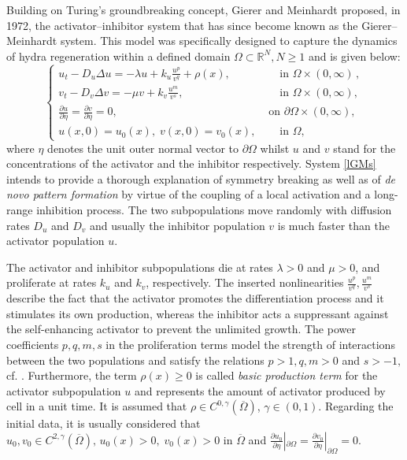 \documentclass[leqno,12pt]{article}
\newcommand{\R}{\mathbb R}
\numberwithin{equation}{section}
\begin{document}
Building on Turing’s groundbreaking concept, Gierer and Meinhardt \cite{GM72} proposed, in 1972, the activator–inhibitor system that has since become known as the Gierer–Meinhardt system. This model was specifically designed to capture the dynamics of hydra regeneration within a defined domain $\Omega\subset \R^N, N\geq 1$ and is given below:
\begin{equation}\label{lGMs}
\begin{cases}
\displaystyle   u_t-D_u\Delta u=-\lambda u+k_u\frac{u^p}{v^q}+\rho(x), &\quad\mbox{ in }\Omega\times(0,\infty)\, ,\\[0.1in]
\displaystyle  v_t -D_v\Delta v=-\mu v+k_v\frac{u^m}{v^s}, &\quad\mbox{ in }\Omega\times(0,\infty),\\[0.1in]
\displaystyle\frac{\partial u}{\partial \eta}=\displaystyle\frac{\partial v}{\partial \eta}=0,  &\mbox{ on }\partial\Omega\times(0,\infty),\,\\[0.1in]
u(x,0)=u_0(x), \; v(x,0)=v_0(x), &\quad\mbox{ in }\Omega,
\end{cases}
\end{equation}
where $\eta$ denotes the unit outer normal vector to $\partial \Omega$ whilst $u$ and $v$ stand for the concentrations
of the activator and the inhibitor respectively. System \eqref{lGMs} intends to provide a thorough explanation of symmetry breaking as well as of {\it de novo pattern formation} by virtue of the coupling of a local activation and a long-range inhibition process.
The two subpopulations move randomly with diffusion rates $D_{u}$ and $D_{v}$ and usually the inhibitor population $v$ is  much faster than the activator population $u.$

The activator and inhibitor subpopulations die at rates $\lambda>0$ and $\mu>0$, and proliferate at rates $k_{u}$ and $k_{v}$, respectively. The inserted nonlinearities $\frac{u^p}{v^q}, \frac{u^m}{v^s}$ describe the fact that the activator promotes the differentiation process and it stimulates its own production, whereas the inhibitor acts a suppressant against the self-enhancing activator to prevent the unlimited growth. The  power coefficients $p,q,m,s$ in the proliferation terms model the strength of interactions between the two populations and satisfy the relations $p>1, q,m>0$ and $s>-1,$ cf. \cite{KS17, KS18}. Furthermore, the term $\rho(x)\geq 0$ is called {\it basic production term} for the activator subpopulation $u$ and represents the amount of activator produced by cell in a unit time. It is assumed that $\rho\in C^{0,\gamma}(\overline{\Omega})$, $\gamma\in (0,1)$. Regarding the initial data, it is usually considered that $u_0, v_0\in C^{2,\gamma}(\overline{\Omega}),\, u_0(x)>0, \; v_0(x)>0 $ in $\overline{\Omega}$ and $\frac{\partial u_0}{\partial \eta}|_{\partial \Omega}=\frac{\partial v_0}{\partial \eta}|_{\partial \Omega}=0$.
\end{document}
